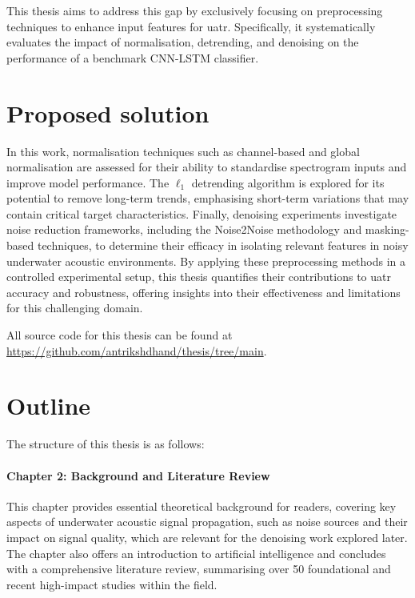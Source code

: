 This thesis aims to address this gap by exclusively focusing on preprocessing techniques to enhance input features for \acrshort{uatr}. Specifically, it systematically evaluates the impact of normalisation, detrending, and denoising on the performance of a benchmark CNN-LSTM classifier.

\section{Proposed solution}

In this work, normalisation techniques such as channel-based and global normalisation are assessed for their ability to standardise spectrogram inputs and improve model performance. The $\ell_1$ detrending algorithm is explored for its potential to remove long-term trends, emphasising short-term variations that may contain critical target characteristics. Finally, denoising experiments investigate noise reduction frameworks, including the Noise2Noise methodology and masking-based techniques, to determine their efficacy in isolating relevant features in noisy underwater acoustic environments. By applying these preprocessing methods in a controlled experimental setup, this thesis quantifies their contributions to \acrshort{uatr} accuracy and robustness, offering insights into their effectiveness and limitations for this challenging domain.

All source code for this thesis can be found at \url{https://github.com/antrikshdhand/thesis/tree/main}.

\section{Outline}

The structure of this thesis is as follows:

\paragraph{Chapter 2: Background and Literature Review} This chapter provides essential theoretical background for readers, covering key aspects of underwater acoustic signal propagation, such as noise sources and their impact on signal quality, which are relevant for the denoising work explored later. The chapter also offers an introduction to artificial intelligence and concludes with a comprehensive literature review, summarising over 50 foundational and recent high-impact studies within the field.

